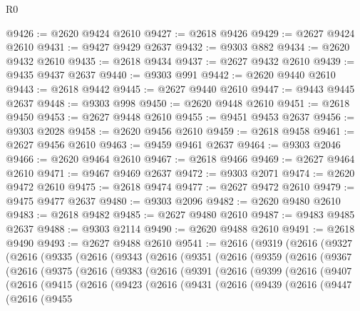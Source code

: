 \begin{lexlean}{R0}
\begin{coremodule}
@9426 := @2620 @9424 @2610
@9427 := @2618 @9426
@9429 := @2627 @9424 @2610
@9431 := @9427 @9429 @2637
@9432 := @9303 @882
@9434 := @2620 @9432 @2610
@9435 := @2618 @9434
@9437 := @2627 @9432 @2610
@9439 := @9435 @9437 @2637
@9440 := @9303 @991
@9442 := @2620 @9440 @2610
@9443 := @2618 @9442
@9445 := @2627 @9440 @2610
@9447 := @9443 @9445 @2637
@9448 := @9303 @998
@9450 := @2620 @9448 @2610
@9451 := @2618 @9450
@9453 := @2627 @9448 @2610
@9455 := @9451 @9453 @2637
@9456 := @9303 @2028
@9458 := @2620 @9456 @2610
@9459 := @2618 @9458
@9461 := @2627 @9456 @2610
@9463 := @9459 @9461 @2637
@9464 := @9303 @2046
@9466 := @2620 @9464 @2610
@9467 := @2618 @9466
@9469 := @2627 @9464 @2610
@9471 := @9467 @9469 @2637
@9472 := @9303 @2071
@9474 := @2620 @9472 @2610
@9475 := @2618 @9474
@9477 := @2627 @9472 @2610
@9479 := @9475 @9477 @2637
@9480 := @9303 @2096
@9482 := @2620 @9480 @2610
@9483 := @2618 @9482
@9485 := @2627 @9480 @2610
@9487 := @9483 @9485 @2637
@9488 := @9303 @2114
@9490 := @2620 @9488 @2610
@9491 := @2618 @9490
@9493 := @2627 @9488 @2610
@9541 := @2616
    (@9319
      (@2616
        (@9327
          (@2616
            (@9335
              (@2616
                (@9343
                  (@2616
                    (@9351
                      (@2616
                        (@9359
                          (@2616
                            (@9367
                              (@2616
                                (@9375
                                  (@2616
                                    (@9383
                                      (@2616
                                        (@9391
                                          (@2616
                                            (@9399
                                              (@2616
                                                (@9407
                                                  (@2616
                                                    (@9415
                                                      (@2616
                                                        (@9423
                                                          (@2616
                                                            (@9431
                                                              (@2616
                                                                (@9439
                                                                  (@2616
                                                                    (@9447
                                                                      (@2616
                                                                        (@9455

\end{coremodule}
\end{lexlean}
